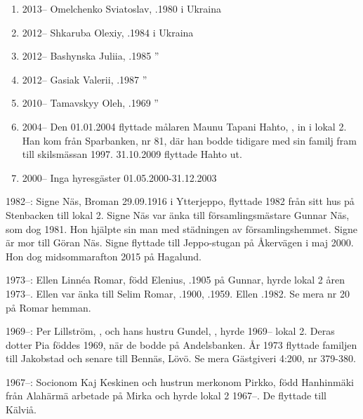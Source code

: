 \begin{enumerate}
  \item 2013--       Omelchenko Sviatoslav,  .1980 i Ukraina
  \item 2012--   Shkaruba Olexiy,        .1984 i Ukraina
  \item 2012--   Bashynska Juliia,       .1985     ''
  \item 2012--   Gasiak Valerii,         .1987     ''
  \item 2010--   Tamavskyy Oleh,         .1969     ''
  \item 2004--   Den 01.01.2004 flyttade målaren Maunu Tapani Hahto, , in i lokal 2. Han kom från Sparbanken, nr 81, där han bodde tidigare med sin familj fram till skilsmässan 1997. 31.10.2009 flyttade Hahto ut.
  \item 2000--	  Inga hyresgäster 01.05.2000-31.12.2003
\end{enumerate}

1982--:
Signe Näs, \textborn Broman 29.09.1916 i Ytterjeppo, flyttade 1982 från sitt hus på Stenbacken till lokal 2. Signe Näs var änka till församlingsmästare Gunnar Näs, som dog 1981. Hon hjälpte sin man med städningen av församlingshemmet.  Signe är mor till Göran Näs. Signe flyttade till Jeppo-stugan på Åkervägen i maj 2000. Hon dog midsommarafton 2015 på Hagalund.

1973--:
Ellen Linnéa Romar, född Elenius, .1905 på Gunnar, hyrde lokal 2 åren 1973--. Ellen var änka till Selim Romar, .1900, .1959. Ellen .1982. Se mera nr 20 på Romar hemman.

1969--:
Per Lillström, , och hans hustru Gundel, , hyrde 1969-- lokal 2. Deras dotter Pia föddes 1969, när de bodde på Andelsbanken. År 1973 flyttade familjen till Jakobstad och senare till Bennäs, Lövö. Se mera Gästgiveri 4:200, nr 379-380.

1967--:
Socionom Kaj Keskinen och hustrun merkonom Pirkko, född Hanhinmäki från Alahärmä arbetade på Mirka och hyrde lokal 2 1967--. De flyttade till Kälviå.


